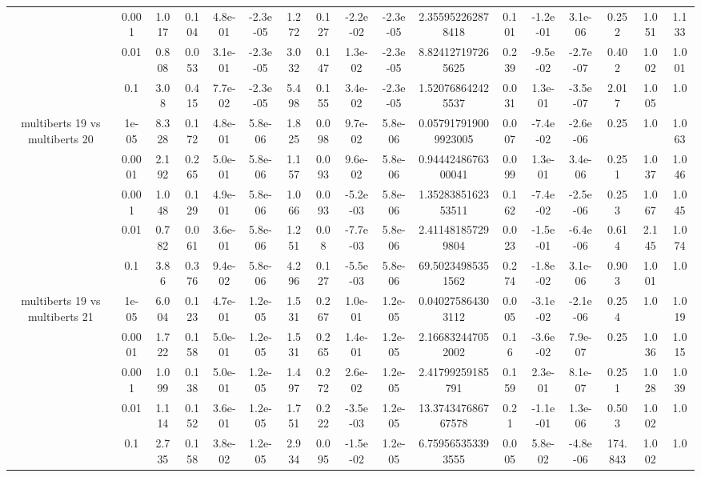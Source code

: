 \begin{tabular}{|c|c|c|c|c|c|c|c|c|c|c|c|c|c|c|c|c|}
 & 0.001 & 1.017 & 0.104 & 4.8e-01 & -2.3e-05 & 1.272 & 0.127 & -2.2e-02 & -2.3e-05 & 2.355952262878418 & 0.101 & -1.2e-01 & 3.1e-06 & 0.252 & 1.051 & 1.133 \\
 & 0.01 & 0.808 & 0.053 & 3.1e-01 & -2.3e-05 & 3.032 & 0.147 & 1.3e-02 & -2.3e-05 & 8.824127197265625 & 0.239 & -9.5e-02 & -2.7e-07 & 0.402 & 1.002 & 1.001 \\
 & 0.1 & 3.08 & 0.415 & 7.7e-02 & -2.3e-05 & 5.498 & 0.155 & 3.4e-02 & -2.3e-05 & 1.520768642425537 & 0.031 & 1.3e-01 & -3.5e-07 & 2.017 & 1.005 & 1.0 \\
\hline
\multirow{5}{*}{multiberts 19 vs multiberts 20} & 1e-05 & 8.328 & 0.172 & 4.8e-01 & 5.8e-06 & 1.825 & 0.098 & 9.7e-02 & 5.8e-06 & 0.057917919009923005 & 0.007 & -7.4e-02 & -2.6e-06 & 0.25 & 1.0 & 1.063 \\
 & 0.0001 & 2.192 & 0.265 & 5.0e-01 & 5.8e-06 & 1.157 & 0.093 & 9.6e-02 & 5.8e-06 & 0.9444248676300041 & 0.099 & 1.3e-01 & 3.4e-06 & 0.251 & 1.037 & 1.046 \\
 & 0.001 & 1.048 & 0.129 & 4.9e-01 & 5.8e-06 & 1.066 & 0.093 & -5.2e-03 & 5.8e-06 & 1.3528385162353511 & 0.162 & -7.4e-02 & -2.5e-06 & 0.253 & 1.067 & 1.045 \\
 & 0.01 & 0.782 & 0.061 & 3.6e-01 & 5.8e-06 & 1.251 & 0.08 & -7.7e-03 & 5.8e-06 & 2.411481857299804 & 0.023 & -1.5e-01 & -6.4e-06 & 0.614 & 2.145 & 1.074 \\
 & 0.1 & 3.86 & 0.376 & 9.4e-02 & 5.8e-06 & 4.296 & 0.127 & -5.5e-03 & 5.8e-06 & 69.50234985351562 & 0.274 & -1.8e-02 & 3.1e-06 & 0.903 & 1.001 & 1.0 \\
\hline
\multirow{5}{*}{multiberts 19 vs multiberts 21} & 1e-05 & 6.004 & 0.123 & 4.7e-01 & 1.2e-05 & 1.531 & 0.267 & 1.0e-01 & 1.2e-05 & 0.040275864303112 & 0.005 & -3.1e-02 & -2.1e-06 & 0.254 & 1.0 & 1.019 \\
 & 0.0001 & 1.722 & 0.158 & 5.0e-01 & 1.2e-05 & 1.531 & 0.265 & 1.4e-01 & 1.2e-05 & 2.166832447052002 & 0.16 & -3.6e-02 & 7.9e-07 & 0.25 & 1.036 & 1.015 \\
 & 0.001 & 1.099 & 0.138 & 5.0e-01 & 1.2e-05 & 1.497 & 0.272 & 2.6e-02 & 1.2e-05 & 2.41799259185791 & 0.159 & 2.3e-01 & 8.1e-07 & 0.251 & 1.028 & 1.039 \\
 & 0.01 & 1.114 & 0.152 & 3.6e-01 & 1.2e-05 & 1.751 & 0.222 & -3.5e-03 & 1.2e-05 & 13.374347686767578 & 0.21 & -1.1e-01 & 1.3e-06 & 0.503 & 1.002 & 1.0 \\
 & 0.1 & 2.735 & 0.158 & 3.8e-02 & 1.2e-05 & 2.934 & 0.095 & -1.5e-02 & 1.2e-05 & 6.759565353393555 & 0.005 & 5.8e-02 & -4.8e-06 & 174.843 & 1.002 & 1.0 \\

\end{tabular}
